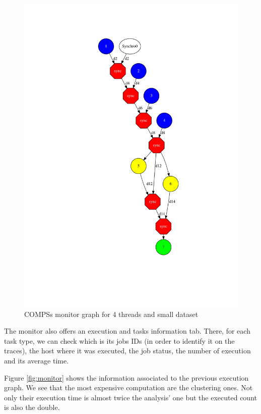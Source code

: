 \begin{figure}[h]
\includegraphics[height=\textheight]{img/main_01_completeGraph.png}
\caption{COMPSs monitor graph for 4 threads and small dataset}
\label{par:graph}
\end{figure}

The monitor also offers an execution and tasks information tab. There, for each task type, we can check which is its jobs IDs (in order to identify it on the traces), the host where it was executed, the job status, the number of execution and its average time. 

Figure \ref{fig:monitor} shows the information associated to the previous execution graph. We see that the most expensive computation are the clustering ones. Not only their execution time is almost twice the analysis' one but the executed count is also the double.

